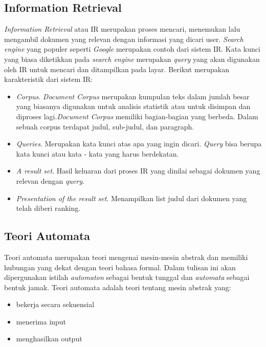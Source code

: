 \subsection{Information Retrieval}
\label{sec:ir}

\textit{Information Retrieval} atau IR merupakan proses mencari, menemukan lalu mengambil dokumen yang relevan dengan informasi yang dicari user. \textit{Search engine} yang populer seperti \textit{Google} merupakan contoh dari sistem IR. Kata kunci yang biasa diketikkan pada \textit{search engine} merupakan \textit{query} yang akan digunakan oleh IR untuk mencari dan ditampilkan pada layar. Berikut merupakan karakteristik dari sistem IR:

\begin{itemize}
	\item \textit{Corpus}. \textit{Document Corpus} merupakan kumpulan teks dalam jumlah besar yang biasanya digunakan untuk analisis statistik atau untuk disimpan dan diproses lagi.\textit{Document Corpus} memiliki bagian-bagian yang berbeda. Dalam sebuah corpus terdapat judul, sub-judul, dan paragraph.
	\item \textit{Queries}. Merupakan kata kunci atas apa yang ingin dicari. \textit{Query} bisa berupa kata kunci atau kata - kata yang harus berdekatan.
	\item \textit{A result set}. Hasil keluaran dari proses IR yang dinilai sebagai dokumen yang relevan dengan \textit{query}.
	\item \textit{Presentation of the result set}. Menampilkan list judul dari dokumen yang telah diberi ranking.
\end{itemize}

\subsection{Teori Automata}
Teori automata\cite{Frisca:2014} merupakan teori mengenai mesin-mesin abstrak dan memiliki hubungan yang dekat dengan teori bahasa formal. Dalam tulisan ini akan dipergunakan istilah \textit{automaton} sebagai bentuk tunggal dan \textit{automata} sebagai bentuk jamak. Teori automata adalah teori tentang mesin abstrak yang:

\begin{itemize}
	\item bekerja secara sekuensial
	\item menerima input
	\item menghasilkan output
\end{itemize}

